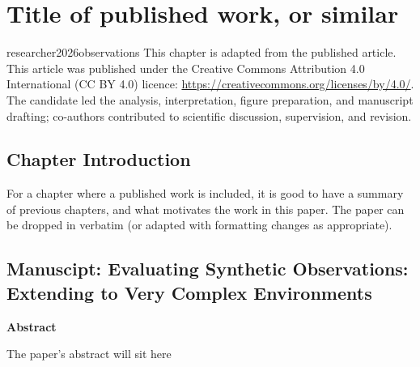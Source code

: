 \chapteropen
\chapter{Title of published work, or similar}\label{ch:paper-example}
\hypertarget{ch:paper-example}{}
\glsresetall
\quoteThree

%
% 

\chapterpublicationnote
    {researcher2026observations} %
    {This chapter is adapted from the published article.}
    {This article was published under the Creative Commons Attribution 4.0 International (CC BY 4.0) licence:
    \url{https://creativecommons.org/licenses/by/4.0/}.}
    {The candidate led the analysis, interpretation, figure preparation, and manuscript drafting; co-authors contributed to scientific discussion, supervision, and revision.}


\section{Chapter Introduction}
For a chapter where a published work is included, it is good to have a summary of previous chapters, and what motivates the work in this paper. The paper can be dropped in verbatim (or adapted with formatting changes as appropriate).


\clearpage
\section{Manuscipt: Evaluating Synthetic Observations: Extending to Very Complex Environments}\label{sec:example_paper}

\begin{center}
    \textbf{Abstract}
\end{center}
The paper's abstract will sit here

